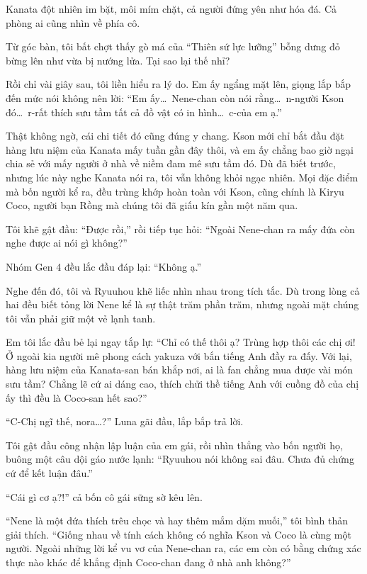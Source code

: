 \documentclass[../main.tex]{subfiles}
\begin{document}
Kanata đột nhiên im bặt, môi mím chặt, cả người đứng yên như hóa đá. Cả phòng ai cũng nhìn về phía cô.

Từ góc bàn, tôi bất chợt thấy gò má của ``Thiên sứ lực lưỡng'' bỗng dưng đỏ bừng lên như vừa bị nướng lửa. Tại sao lại thế nhỉ?

Rồi chỉ vài giây sau, tôi liền hiểu ra lý do. Em ấy ngẩng mặt lên, giọng lắp bắp đến mức nói không nên lời: ``Em ấy\dots\ Nene-chan còn nói rằng\dots\ n-người Kson đó\dots\ r-rất thích sưu tầm tất cả đồ vật có in hình\dots\ c-của em ạ.''

Thật không ngờ, cái chi tiết đó cũng đúng y chang. Kson mới chỉ bắt đầu đặt hàng lưu niệm của Kanata mấy tuần gần đây thôi, và em ấy chẳng bao giờ ngại chia sẻ với mấy người ở nhà về niềm đam mê sưu tầm đó. Dù đã biết trước, nhưng lúc này nghe Kanata nói ra, tôi vẫn không khỏi ngạc nhiên. Mọi đặc điểm mà bốn người kể ra, đều trùng khớp hoàn toàn với Kson, cũng chính là Kiryu Coco, người bạn Rồng mà chúng tôi đã giấu kín gần một năm qua.

Tôi khẽ gật đầu: ``Được rồi,'' rồi tiếp tục hỏi: ``Ngoài Nene-chan ra mấy đứa còn nghe được ai nói gì không?''

Nhóm Gen 4 đều lắc đầu đáp lại: ``Không ạ.''

Nghe đến đó, tôi và Ryuuhou khẽ liếc nhìn nhau trong tích tắc. Dù trong lòng cả hai đều biết tỏng lời Nene kể là sự thật trăm phần trăm, nhưng ngoài mặt chúng tôi vẫn phải giữ một vẻ lạnh tanh.

Em tôi lắc đầu bẻ lại ngay tắp lự: ``Chỉ có thế thôi ạ? Trùng hợp thôi các chị ơi! Ở ngoài kia người mê phong cách yakuza với bắn tiếng Anh đầy ra đấy. Với lại, hàng lưu niệm của Kanata-san bán khắp nơi, ai là fan chẳng mua được vài món sưu tầm? Chẳng lẽ cứ ai dáng cao, thích chửi thề tiếng Anh với cuồng đồ của chị ấy thì đều là Coco-san hết sao?''

``C-Chị ngĩ thế, nora\dots?'' Luna gãi đầu, lắp bắp trả lời.

Tôi gật đầu công nhận lập luận của em gái, rồi nhìn thẳng vào bốn người họ, buông một câu dội gáo nước lạnh: ``Ryuuhou nói không sai đâu. Chưa đủ chứng cứ để kết luận đâu.''

``Cái gì cơ ạ?!'' cả bốn cô gái sững sờ kêu lên.

``Nene là một đứa thích trêu chọc và hay thêm mắm dặm muối,'' tôi bình thản giải thích. ``Giống nhau về tính cách không có nghĩa Kson và Coco là cùng một người. Ngoài những lời kể vu vơ của Nene-chan ra, các em còn có bằng chứng xác thực nào khác để khẳng định Coco-chan đang ở nhà anh không?''
\end{document}
